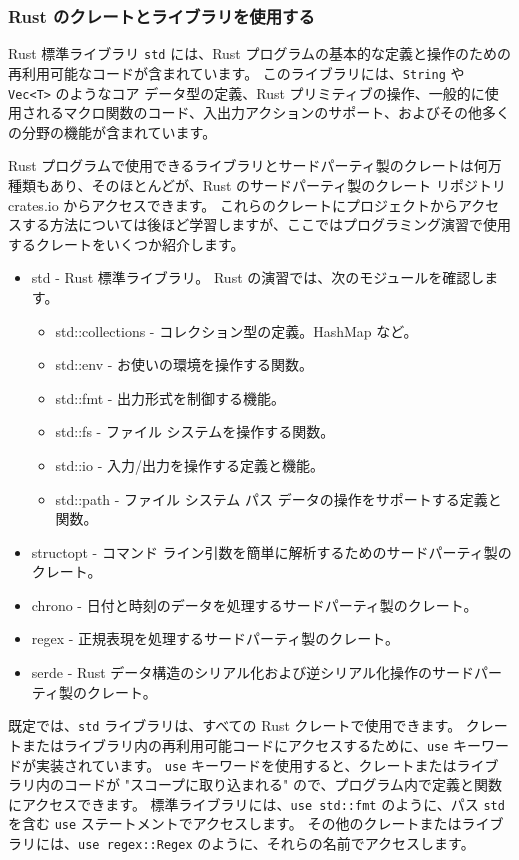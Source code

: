 \subsubsection{Rust のクレートとライブラリを使用する}

Rust 標準ライブラリ \texttt{std} には、Rust プログラムの基本的な定義と操作のための再利用可能なコードが含まれています。 このライブラリには、\texttt{String} や \texttt{Vec<T>} のようなコア データ型の定義、Rust プリミティブの操作、一般的に使用されるマクロ関数のコード、入出力アクションのサポート、およびその他多くの分野の機能が含まれています。

Rust プログラムで使用できるライブラリとサードパーティ製のクレートは何万種類もあり、そのほとんどが、Rust のサードパーティ製のクレート リポジトリ crates.io からアクセスできます。 これらのクレートにプロジェクトからアクセスする方法については後ほど学習しますが、ここではプログラミング演習で使用するクレートをいくつか紹介します。

\begin{itemize}
\item std - Rust 標準ライブラリ。 Rust の演習では、次のモジュールを確認します。
\begin{itemize}
\item std::collections - コレクション型の定義。HashMap など。
\item std::env - お使いの環境を操作する関数。
\item std::fmt - 出力形式を制御する機能。
\item std::fs - ファイル システムを操作する関数。
\item std::io - 入力/出力を操作する定義と機能。
\item std::path - ファイル システム パス データの操作をサポートする定義と関数。
\end{itemize}
\item structopt - コマンド ライン引数を簡単に解析するためのサードパーティ製のクレート。
\item chrono - 日付と時刻のデータを処理するサードパーティ製のクレート。
\item regex - 正規表現を処理するサードパーティ製のクレート。
\item serde - Rust データ構造のシリアル化および逆シリアル化操作のサードパーティ製のクレート。
\end{itemize}


既定では、\texttt{std} ライブラリは、すべての Rust クレートで使用できます。 クレートまたはライブラリ内の再利用可能コードにアクセスするために、\texttt{use} キーワードが実装されています。 \texttt{use} キーワードを使用すると、クレートまたはライブラリ内のコードが "スコープに取り込まれる" ので、プログラム内で定義と関数にアクセスできます。 標準ライブラリには、\texttt{use std::fmt} のように、パス \texttt{std} を含む \texttt{use} ステートメントでアクセスします。 その他のクレートまたはライブラリには、\texttt{use regex::Regex} のように、それらの名前でアクセスします。

